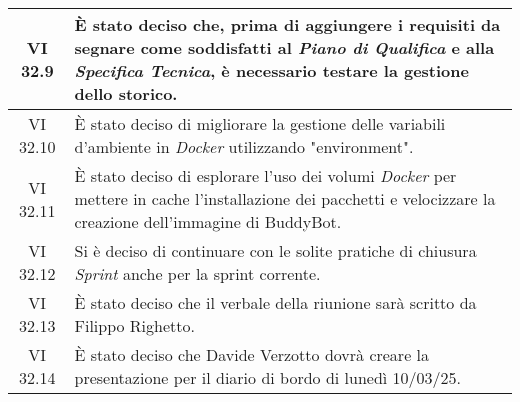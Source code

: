 \begin{table}[htbp]
\begin{tabular}{|c|p{}|}
        \hline
        VI 32.9 & È stato deciso che, prima di aggiungere i requisiti da segnare come soddisfatti al \emph{Piano di Qualifica} e alla \emph{Specifica Tecnica}, è necessario testare la gestione dello storico.\\
        \hline
        VI 32.10 & È stato deciso di migliorare la gestione delle variabili d’ambiente in \emph{Docker} utilizzando "environment". \\
        \hline
        VI 32.11 & È stato deciso di esplorare l’uso dei volumi \emph{Docker} per mettere in cache l’installazione dei pacchetti e velocizzare la creazione dell’immagine di BuddyBot.\\
        \hline
        VI 32.12 & Si è deciso di continuare con le solite pratiche di chiusura \emph{Sprint} anche per la sprint corrente. \\
        \hline
        VI 32.13 & È stato deciso che il verbale della riunione sarà scritto da Filippo Righetto. \\
        \hline
        VI 32.14 & È stato deciso che Davide Verzotto dovrà creare la presentazione per il diario di bordo di lunedì 10/03/25. \\
        \hline
    \end{tabular}
\end{table}